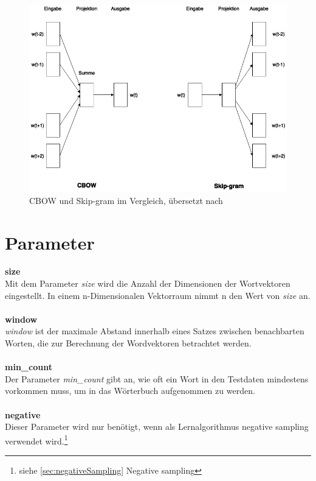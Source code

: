 \documentclass[12pt,a4paper]{report}
\begin{document}
\begin{figure}[h]
  \begin{center}
	\includegraphics[scale=0.55]{CBOWvsSkip-gram.png}
  \end{center}  
  \caption{CBOW und Skip-gram im Vergleich, übersetzt nach \cite{DBLP:journals/corr/abs-1301-3781}}
  \label{cbowvsskipgram}
\end{figure}

	\section{Parameter}
	
	\textbf{size}
	\vspace{1em}\\
	Mit dem Parameter \textit{size} wird die Anzahl der Dimensionen der Wortvektoren eingestellt. In einem n-Dimensionalen Vektorraum nimmt n den Wert von \textit{size} an.\\	
	\vspace{1em}\\
	\textbf{window}
	\vspace{1em}\\
	\textit{window} ist der maximale Abstand innerhalb eines Satzes zwischen benachbarten Worten, die zur Berechnung der Wordvektoren betrachtet werden.\\
	\vspace{1em}\\
	\textbf{min\_count}
	\vspace{1em}\\
	Der Parameter \textit{min\_count} gibt an, wie oft ein Wort in den Testdaten mindestens vorkommen muss, um in das Wörterbuch aufgenommen zu werden.\\
	\vspace{1em}\\
	\textbf{negative}
	\vspace{1em}\\
	Dieser Parameter wird nur benötigt, wenn als Lernalgorithmus negative sampling verwendet wird.\footnote{siehe \ref{sec:negativeSampling} Negative sampling}
	
\end{document}
